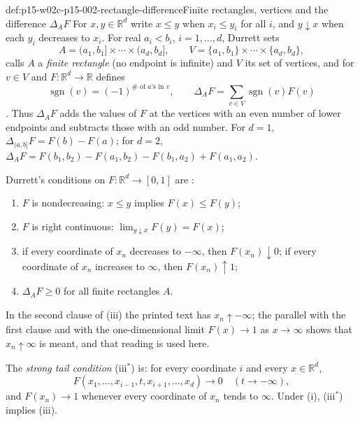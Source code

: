 \begin{hbdefinition}{def:p15-w02c-p15-002-rectangle-difference}{Finite rectangles, vertices and the difference \(\Delta_AF\)}
For \(x,y\in\mathbb R^d\) write \(x\leq y\) when \(x_i\leq y_i\) for all
\(i\), and \(y\downarrow x\) when each \(y_i\) decreases to \(x_i\). For
real \(a_i<b_i\), \(i=1,\ldots,d\), Durrett sets
\[
 A=(a_1,b_1]\times\cdots\times(a_d,b_d],\qquad
 V=\{a_1,b_1\}\times\cdots\times\{a_d,b_d\},
\]
calls \(A\) a \emph{finite rectangle} (no endpoint is infinite) and \(V\)
its set of vertices, and for \(v\in V\) and \(F:\mathbb R^d\to\mathbb R\)
defines
\[
 \operatorname{sgn}(v)=(-1)^{\#\text{ of }a\text{'s in }v},\qquad
 \Delta_AF=\sum_{v\in V}\operatorname{sgn}(v)F(v)
\]
\cite[p.~7]{DurrettPTEAuthor2019}. Thus \(\Delta_AF\) adds the values of
\(F\) at the vertices with an even number of lower endpoints and subtracts
those with an odd number. For \(d=1\), \(\Delta_{(a,b]}F=F(b)-F(a)\); for
\(d=2\),
\(\Delta_AF=F(b_1,b_2)-F(a_1,b_2)-F(b_1,a_2)+F(a_1,a_2)\).

Durrett's conditions on \(F:\mathbb R^d\to[0,1]\) are
\cite[pp.~6--7]{DurrettPTEAuthor2019}:
\begin{enumerate}
\item[(i)] \(F\) is nondecreasing: \(x\leq y\) implies \(F(x)\leq F(y)\);
\item[(ii)] \(F\) is right continuous:
      \(\lim_{y\downarrow x}F(y)=F(x)\);
\item[(iii)] if every coordinate of \(x_n\) decreases to \(-\infty\), then
      \(F(x_n)\downarrow0\); if every coordinate of \(x_n\) increases to
      \(\infty\), then \(F(x_n)\uparrow1\);
\item[(iv)] \(\Delta_AF\geq0\) for all finite rectangles \(A\).
\end{enumerate}
In the second clause of (iii) the printed text has \(x_n\uparrow-\infty\);
the parallel with the first clause and with the one-dimensional limit
\(F(x)\to1\) as \(x\to\infty\) shows that \(x_n\uparrow\infty\) is meant,
and that reading is used here.

The \emph{strong tail condition} (iii\(^*\)) is: for every coordinate
\(i\) and every \(x\in\mathbb R^d\),
\[
 F(x_1,\ldots,x_{i-1},t,x_{i+1},\ldots,x_d)\to0\quad(t\to-\infty),
\]
and \(F(x_n)\to1\) whenever every coordinate of \(x_n\) tends to
\(\infty\). Under (i), (iii\(^*\)) implies (iii).
\end{hbdefinition}

